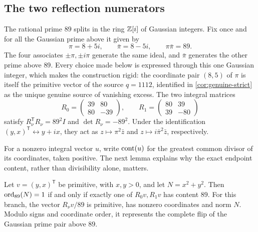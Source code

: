 \subsection{The two reflection numerators}

The rational prime $89$ splits in the ring $\mathbb{Z}[i]$ of Gaussian integers.
Fix once and for all the Gaussian prime above it given by
\begin{equation}
 \pi=8+5i,\qquad \bar\pi=8-5i,\qquad \pi\bar\pi=89.
 \label{eq:gaussian-prime}
\end{equation}
The four associates $\pm\pi,\pm i\pi$ generate the same ideal, and
$\bar\pi$ generates the other prime above $89$. Every choice made below is
expressed through this one Gaussian integer, which makes the construction
rigid: the coordinate pair $(8,5)$ of $\pi$ is itself the primitive vector
of the source $q=1112$, identified in \cref{cor:genuine-strict} as the
unique genuine source of vanishing excess. The two integral matrices
\begin{equation}
 R_0=\begin{pmatrix}39&80\\80&-39\end{pmatrix},\qquad
 R_1=\begin{pmatrix}80&39\\39&-80\end{pmatrix}
 \label{eq:reflections}
\end{equation}
satisfy $R_\nu^{\mathsf T}R_\nu=89^2I$ and $\det R_\nu=-89^2$.
Under the identification $(y,x)^{\mathsf T}\leftrightarrow y+ix$, they act
as $z\mapsto\pi^2\bar z$ and $z\mapsto i\bar\pi^2\bar z$, respectively.

For a nonzero integral vector $u$, write $\operatorname{cont}\!\left(u\right)$ for the greatest common
divisor of its coordinates, taken positive. The next lemma explains why
the exact endpoint content, rather than divisibility alone, matters.

\begin{lemma}
\label{lem:primitive-flip}
Let $v=(y,x)^{\mathsf T}$ be primitive, with $x,y>0$, and let
$N=x^2+y^2$. Then $\operatorname{ord}_{89}(N)=1$ if and only if exactly one of $R_0v,R_1v$
has content $89$. For this branch, the vector $R_\nu v/89$ is primitive,
has nonzero coordinates and norm $N$. Modulo signs and coordinate order,
it represents the complete flip of the Gaussian prime pair above $89$.
\end{lemma}

